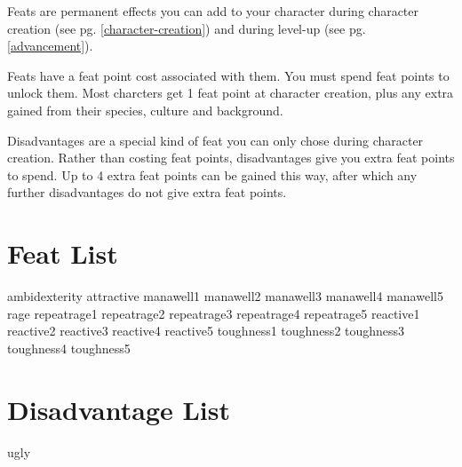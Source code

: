 \begin{multicols*}{2}
    Feats are permanent effects you can add to your character during character
    creation (see pg. \ref{character-creation}) and during level-up (see pg.
    \ref{advancement}).

    Feats have a feat point cost associated with them. You must spend feat
    points to unlock them. Most charcters get 1 feat point at character
    creation, plus any extra gained from their species, culture and background.

    Disadvantages are a special kind of feat you can only chose during
    character creation. Rather than costing feat points, disadvantages give you
    extra feat points to spend. Up to 4 extra feat points can be gained this
    way, after which any further disadvantages do not give extra feat points.

    \section{Feat List}
    {ambidexterity}
    {attractive}
    {manawell1}
    {manawell2}
    {manawell3}
    {manawell4}
    {manawell5}
    {rage}
    {repeatrage1}
    {repeatrage2}
    {repeatrage3}
    {repeatrage4}
    {repeatrage5}
    {reactive1}
    {reactive2}
    {reactive3}
    {reactive4}
    {reactive5}
    {toughness1}
    {toughness2}
    {toughness3}
    {toughness4}
    {toughness5}

    \section{Disadvantage List}
    {ugly}

\end{multicols*}
